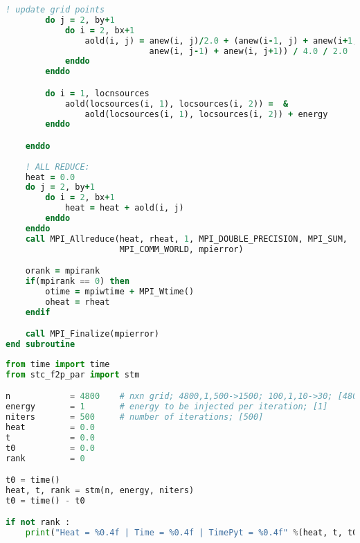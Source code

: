 \begin{lstlisting}[language=Fortran, caption={Parallel F2PY implementation of the stencil test case - F90 module code.}]
        ! update grid points
        do j = 2, by+1 
            do i = 2, bx+1
                aold(i, j) = anew(i, j)/2.0 + (anew(i-1, j) + anew(i+1, j) +  &
                             anew(i, j-1) + anew(i, j+1)) / 4.0 / 2.0
            enddo
        enddo

        do i = 1, locnsources
            aold(locsources(i, 1), locsources(i, 2)) =  &
                aold(locsources(i, 1), locsources(i, 2)) + energy
        enddo

    enddo
   
    ! ALL REDUCE:
    heat = 0.0
    do j = 2, by+1 
        do i = 2, bx+1
            heat = heat + aold(i, j)
        enddo
    enddo
    call MPI_Allreduce(heat, rheat, 1, MPI_DOUBLE_PRECISION, MPI_SUM,  &
                       MPI_COMM_WORLD, mpierror)

    orank = mpirank
    if(mpirank == 0) then
        otime = mpiwtime + MPI_Wtime()
        oheat = rheat
    endif

    call MPI_Finalize(mpierror)
end subroutine
\end{lstlisting}




\begin{lstlisting}[language=Python, caption={Parallel F2PY implementation of the stencil test case - Python main code.}]
from time import time
from stc_f2p_par import stm

n            = 4800    # nxn grid; 4800,1,500->1500; 100,1,10->30; [4800]
energy       = 1       # energy to be injected per iteration; [1]
niters       = 500     # number of iterations; [500]
heat         = 0.0
t            = 0.0
t0           = 0.0
rank         = 0

t0 = time()
heat, t, rank = stm(n, energy, niters)
t0 = time() - t0

if not rank :
    print("Heat = %0.4f | Time = %0.4f | TimePyt = %0.4f" %(heat, t, t0))
\end{lstlisting}




